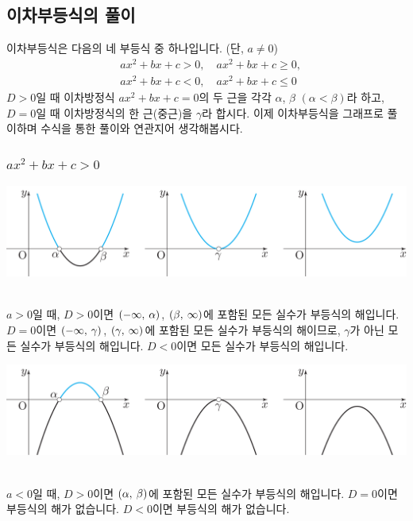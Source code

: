 \subsection{이차부등식의 풀이}
이차부등식은 다음의 네 부등식 중 하나입니다. (단, $a \ne 0$)
\begin{align*}
	&ax^2 + bx + c > 0, \quad ax^2 + bx + c \ge 0, \\
	&ax^2 + bx + c < 0, \quad ax^2 + bx + c \le 0  
\end{align*}
\clearpage
$D>0$일 때 이차방정식 $ax^2 + bx + c=0$의 두 근을 각각 $\alpha$, $\beta$ $(\alpha<\beta)$라 하고, $D=0$일 때 이차방정식의 한 근(중근)을 $\gamma$라 합시다. 이제 이차부등식을 그래프로 풀이하며 수식을 통한 풀이와 연관지어 생각해봅시다. 
\subsubsection{$ax^2 + bx + c > 0$}
\begin{center} \includegraphics[scale=\pgfkeysvalueof{picsize}]{DBs/pic/zery_24.pdf}\
	\end{center}$a>0$일 때, $D>0$이면 $\left(-\infty,\: \alpha\right)$, $\left(\beta,\: \infty\right)$에 포함된 모든 실수가 부등식의 해입니다. $D=0$이면 $\left(-\infty,\: \gamma\right)$, $\left(\gamma,\: \infty\right)$에 포함된 모든 실수가 부등식의 해이므로, $\gamma$가 아닌 모든 실수가 부등식의 해입니다.  $D<0$이면 모든 실수가 부등식의 해입니다.
\begin{center} \includegraphics[scale=\pgfkeysvalueof{picsize}]{DBs/pic/zery_24_1.pdf}\
	\end{center}$a<0$일 때, $D>0$이면 $\left(\alpha,\: \beta\right)$에 포함된 모든 실수가 부등식의 해입니다. $D=0$이면 부등식의 해가 없습니다. $D<0$이면 부등식의 해가 없습니다.
